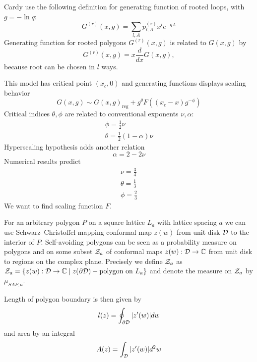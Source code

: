 \documentclass[12pt]{article}
\begin{document}
Cardy \cite{cardy2001exact} use the following definition for generating function of rooted loops,
with $g=-\ln q$:
\begin{equation}
  \label{eq:76}
  G^{(r)}(x,g)=\sum_{l,A} p_{l,A}^{(r)} x^{l} e^{-gA}
\end{equation}
Generating function for rooted polygons $G^{(r)}(x,g)$ is related to $G(x,g)$ by
\begin{equation}
  \label{eq:81}
  G^{(r)}(x,g)=x \frac{d}{dx} G(x,g),
\end{equation}
because root can be chosen in $l$ ways. 

This model has critical point $(x_{c},0)$ and generating functions displays scaling behavior
\begin{equation}
  \label{eq:77}
  G(x,g)\sim G(x,g)_{\mathrm{reg}}+g^{\theta} F\left((x_{c}-x)g^{-\phi}\right)
\end{equation}
Critical indices $\theta,\phi$ are related to conventional exponents $\nu,\alpha$:
\begin{eqnarray}
  \label{eq:78}
  \phi=\frac{1}{2}\nu\\
  \theta=\frac{1}{2}(1-\alpha) \nu
\end{eqnarray}
Hyperscaling hypothesis adds another relation
\begin{equation}
  \label{eq:79}
  \alpha=2-2\nu
\end{equation}
Numerical results predict
\begin{eqnarray}
  \label{eq:80}
  \nu=\frac{3}{4}\\
  \theta=\frac{1}{3}\\
  \phi=\frac{2}{3}
\end{eqnarray}
We want to find scaling function $F$.

For an arbitrary polygon $P$ on a square lattice $L_{a}$ with lattice spacing $a$ we can use
Schwarz–Christoffel mapping conformal map $z(w)$ from unit disk ${\cal D}$ to the interior of $P$.
Self-avoiding polygons can be seen as a probability measure on polygons and on some subset ${\cal
  Z}_{a}$ of conformal maps $z(w):{\cal D}\to \mathbb{C}$ from unit disk to regions on the complex
plane. Precisely we define ${\cal Z}_{a}$ as ${\cal Z}_{a}=\{z(w):{\cal D}\to \mathbb{C}\; |\;
z(\partial{\cal D}) - \mbox{polygon on }L_{a}\}$ and denote the measure on ${\cal Z}_{a}$ by $\mu_{SAP,a}$.

Length of polygon boundary is then given by 
\begin{equation}
  \label{eq:2}
  l(z)=\oint_{\partial{\cal D}} |z'(w)| dw
\end{equation}
and area by an integral
\begin{equation}
  \label{eq:3}
  A(z)=\int_{{\cal D}} |z'(w)| d^{2}w
\end{equation}
\end{document}
